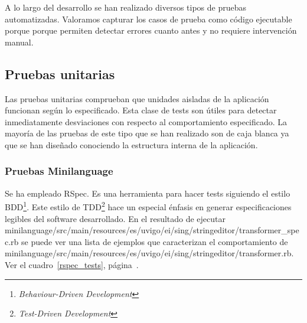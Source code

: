 A lo largo del desarrollo se han realizado diversos tipos de pruebas
automatizadas. Valoramos capturar los casos de prueba como código
ejecutable porque porque permiten detectar errores cuanto antes y no
requiere intervención manual.

\subsection{Pruebas unitarias}

Las pruebas unitarias comprueban que unidades aisladas de la
aplicación funcionan según lo especificado. Esta clase de tests son
útiles para detectar inmediatamente desviaciones con respecto al
comportamiento especificado. La mayoría de las pruebas de este tipo
que se han realizado son de caja blanca ya que se han diseñado
conociendo la estructura interna de la aplicación.

\subsubsection{Pruebas Minilanguage}

Se ha empleado RSpec\cite{RSPEC}. Es una herramienta para hacer tests
siguiendo el estilo BDD\footnote{\emph{Behaviour-Driven
    Development}}. Este estilo de TDD\footnote{\emph{Test-Driven
    Development}} hace un especial énfasis en generar especificaciones
legibles del software desarrollado. En el resultado de ejecutar
minilanguage/src/main/resources/es/uvigo/ei/sing/stringeditor/transformer\_spec.rb
se puede ver una lista de ejemplos que caracterizan el comportamiento
de
minilanguage/src/main/resources/es/uvigo/ei/sing/stringeditor/transformer.rb. Ver
el cuadro~\ref{rspec_tests}, página~\pageref{rspec_tests}.

